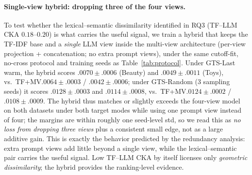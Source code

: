 \documentclass[sigconf,natbib=true,anonymous]{acmart}
\newcommand{\tfidf}{\textsc{TF-IDF}\xspace}
\newcommand{\tfmv}{\textsc{TF+MV}\xspace}
\begin{document}
\paragraph{Single-view hybrid: dropping three of the four views.}
To test whether the lexical--semantic dissimilarity identified in RQ3 (TF--LLM CKA $0.18$--$0.20$) is what carries the useful signal, we train a hybrid that keeps the \tfidf base and a \emph{single} LLM view inside the multi-view architecture (per-view projection + concatenation; no extra prompt views), under the same cutoff-fit, no-cross protocol and training seeds as Table~\ref{tab:protocol}.
Under GTS-Last warm, the hybrid scores $.0070\pm.0006$ (Beauty) and $.0049\pm.0011$ (Toys), vs.\ \tfmv $.0064\pm.0003$ / $.0042\pm.0006$; under GTS-Random (3 sampling seeds) it scores $.0128\pm.0003$ and $.0114\pm.0008$, vs.\ \tfmv $.0124\pm.0002$ / $.0108\pm.0009$.
The hybrid thus matches or slightly exceeds the four-view model on both datasets under both target modes while using one prompt view instead of four; the margins are within roughly one seed-level std, so we read this as \emph{no loss from dropping three views} plus a consistent small edge, not as a large additive gain.
This is exactly the behavior predicted by the redundancy analysis: extra prompt views add little beyond a single view, while the lexical--semantic pair carries the useful signal.
Low TF--LLM CKA by itself licenses only \emph{geometric dissimilarity}; the hybrid provides the ranking-level evidence.
\end{document}
